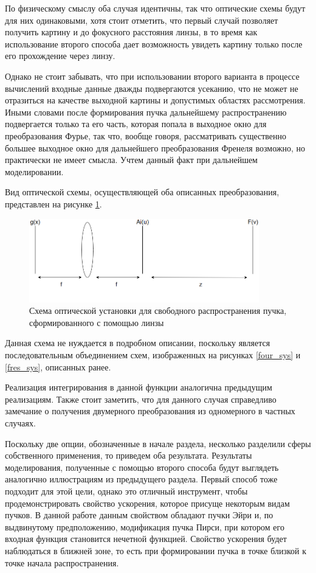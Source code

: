 {	
По физическому смыслу оба случая идентичны, так что оптические схемы будут для них одинаковыми, хотя стоит отметить, что первый случай позволяет получить картину и до фокусного расстояния линзы, в то время как использование второго способа дает возможность увидеть картину только после его прохождение через линзу. 

Однако не стоит забывать, что при использовании второго варианта в процессе вычислений входные данные дважды подвергаются усеканию, что не может не отразиться на качестве выходной картины и допустимых областях рассмотрения. Иными словами после формирования пучка дальнейшему распространению подвергается только та его часть, которая попала в выходное окно для преобразования Фурье, так что, вообще говоря, рассматривать существенно большее выходное окно для дальнейшего преобразования Френеля возможно, но практически не имеет смысла. Учтем данный факт при дальнейшем моделировании.

Вид оптической схемы, осуществляющей оба описанных преобразования, представлен на рисунке \ref{four_fres_sys}.

\begin{figure}[H]
		  \begin{center}
			\includegraphics[width=10cm]{plots/four_fres_sys}
	\caption{Схема оптической установки для свободного распространения пучка, сформированного с помощью линзы}
	\label{four_fres_sys}
		 \end{center}
\end{figure}
	Данная схема не нуждается в подробном описании, поскольку является последовательным объединением схем, изображенных на рисунках  \ref{four_sys} и \ref{fres_sys},  описанных ранее.
	
	Реализация интегрирования в данной функции аналогична предыдущим реализациям. Также стоит заметить, что для данного случая справедливо замечание о получения двумерного преобразования из одномерного в частных случаях.	
	
	Поскольку две опции, обозначенные в начале раздела, несколько разделили сферы собственного применения, то приведем оба результата. Результаты моделирования, полученные с помощью второго способа будут выглядеть аналогично иллюстрациям из предыдущего раздела. Первый способ тоже подходит для этой цели, однако это отличный инструмент, чтобы продемонстрировать свойство ускорения, которое присуще некоторым видам пучков. В данной работе данным свойством обладают пучки Эйри и, по выдвинутому предположению, модификация пучка Пирси, при котором его входная функция становится нечетной функцией. Свойство ускорения будет наблюдаться в ближней зоне, то есть при формировании пучка в точке близкой к точке начала распространения.
	
}
